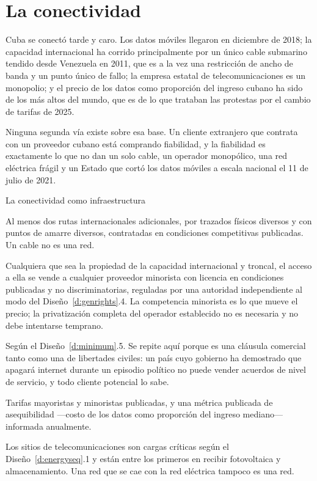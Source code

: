 \section{La conectividad}

Cuba se conectó tarde y caro. Los datos móviles llegaron en diciembre de 2018; la capacidad
internacional ha corrido principalmente por un único cable submarino tendido desde Venezuela
en 2011, que es a la vez una restricción de ancho de banda y un punto único de fallo; la
empresa estatal de telecomunicaciones es un monopolio; y el precio de los datos como
proporción del ingreso cubano ha sido de los más altos del mundo, que es de lo que trataban
las protestas por el cambio de tarifas de 2025.

Ninguna segunda vía existe sobre esa base. Un cliente extranjero que contrata con un
proveedor cubano está comprando fiabilidad, y la fiabilidad es exactamente lo que no dan un
solo cable, un operador monopólico, una red eléctrica frágil y un Estado que cortó los datos
móviles a escala nacional el 11 de julio de 2021.

\begin{design}{La conectividad como infraestructura}
\label{d:connect}
\begin{rules}
 Al menos dos rutas internacionales adicionales, por trazados físicos
diversos y con puntos de amarre diversos, contratadas en condiciones competitivas
publicadas. Un cable no es una red.

 Cualquiera que sea la propiedad de la capacidad
internacional y troncal, el acceso a ella se vende a cualquier proveedor minorista con
licencia en condiciones publicadas y no discriminatorias, reguladas por una autoridad
independiente al modo del Diseño~\ref{d:genrights}.4. La competencia minorista es lo que mueve
el precio; la privatización completa del operador establecido no es necesaria y no debe
intentarse temprano.

 Según el Diseño~\ref{d:minimum}.5. Se repite aquí
porque es una cláusula comercial tanto como una de libertades civiles: un país cuyo gobierno
ha demostrado que apagará internet durante un episodio político no puede vender acuerdos de
nivel de servicio, y todo cliente potencial lo sabe.

 Tarifas mayoristas y minoristas publicadas, y una métrica
publicada de asequibilidad ---costo de los datos como proporción del ingreso mediano---
informada anualmente.

 Los sitios de telecomunicaciones son cargas críticas según el
Diseño~\ref{d:energyseq}.1 y están entre los primeros en recibir fotovoltaica y
almacenamiento. Una red que se cae con la red eléctrica tampoco es una red.
\end{rules}
\end{design}

